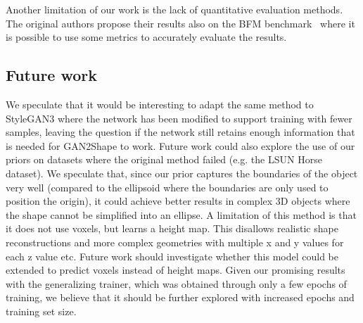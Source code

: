 Another limitation of our work is the lack of quantitative evaluation methods. The original authors propose their results also on the BFM benchmark~\cite{paysan20093d} where it is possible to use some metrics to accurately evaluate the results. 
\subsection{Future work}
We speculate that it would be interesting to adapt the same method to StyleGAN3 \cite{stylegan3} where the network has been modified to support training with fewer samples, leaving the question if the network still retains enough information that is needed for GAN2Shape to work. Future work could also explore the use of our priors on datasets where the original method failed (e.g. the LSUN Horse dataset). We speculate that, since our prior captures the boundaries of the object very well (compared to the ellipsoid where the boundaries are only used to position the origin), it could achieve better results in complex 3D objects where the shape cannot be simplified into an ellipse. A limitation of this method is that it does not use voxels, but learns a height map. This disallows realistic shape reconstructions and more complex geometries with multiple x and y values for each z value etc. Future work should investigate whether this model could be extended to predict voxels instead of height maps. Given our promising results with the generalizing trainer, which was obtained through only a few epochs of training, we believe that it should be further explored with increased epochs and training set size.
% 
% 
